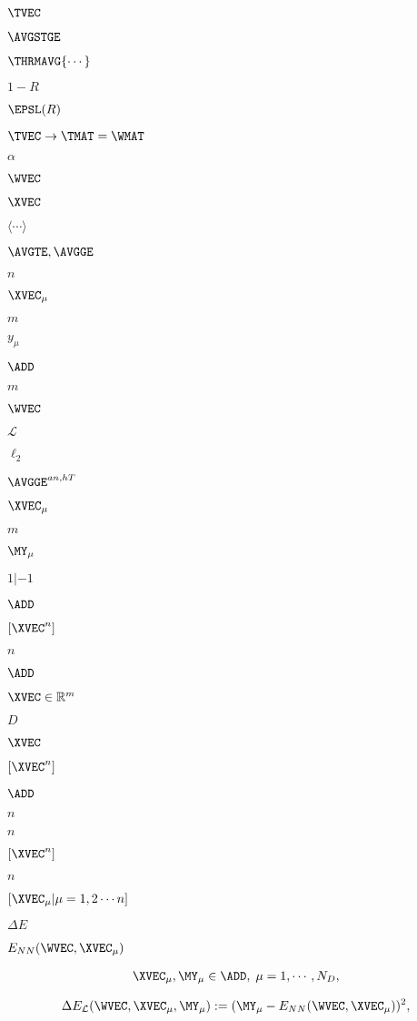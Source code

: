 $\TVEC$

$\AVGSTGE$

$\THRMAVG{\cdots}$

$1-R$

$\EPSL(R)$

$\TVEC\rightarrow\TMAT=\WMAT$

$\alpha$


$\WVEC$

$\XVEC$

$\langle \cdots \rangle$

$\AVGTE, \AVGGE$

$n$

$\XVEC_{\mu}$

$m$

$y_{\mu}$

$\ADD$

$m$

$\WVEC$

$\mathcal{L}$

$\ell_2$

$\AVGGE^{an,hT}$

$\XVEC_{\mu}$

$m$

$\MY_{\mu}$

$1|-1$

$\ADD$

$[\XVEC^{n}]$

$n$

$\ADD$

$\XVEC \in \mathbb{R}^{m}$

$D$

$\XVEC$

$[\XVEC^{n}]$

$\ADD$

$n$

$n$

$[\XVEC^{n}]$

$n$

$[\XVEC_{\mu}|\mu=1,2\cdots n]$

$\Delta E$

$E_{NN}(\WVEC,\XVEC_{\mu})$

\begin{align}
  \label{eqn:x}
  \XVEC_{\mu}, \MY_{\mu} \in\ADD,\;\mu=1, \cdots, N_{D} ,
\end{align}

\begin{align}
  \label{eqn:DEy}
  \Delta E_{\mathcal{L}}(\WVEC,\XVEC_{\mu},\MY_{\mu}):= (\MY_{\mu}-E_{NN}(\WVEC,\XVEC_{\mu}))^{2}  ,
\end{align}


